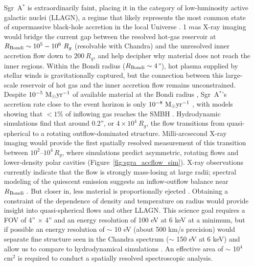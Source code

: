 \documentclass{article}
\begin{document}
\label{sec:accretion_feed}

Sgr~A$^*$ is extraordinarily faint, placing it in the category of low-luminosity active galactic nuclei (LLAGN), a regime that likely represents the most common state of supermassive black-hole accretion in the local Universe \cite{Ho2008}. 1 $m$as X-ray imaging would bridge the current gap between the resolved hot-gas reservoir at $R_{\rm Bondi} \sim 10^5-10^6\ R_g$ (resolvable with Chandra) and the unresolved inner accretion flow down to $200\ R_g$, and help decipher why material does not reach the inner regions. Within the Bondi radius ($R_{\rm Bondi} \sim 4$''), hot plasma supplied by stellar winds is gravitationally captured, but the connection between this large-scale reservoir of hot gas and the inner accretion flow remains unconstrained. Despite $10^{-5}\ \rm M_\odot yr^{-1}$ of available material at the Bondi radius \cite{Cuadra2008}, Sgr~A$^*$'s accretion rate close to the event horizon is only $10^{-8}\ \rm M_\odot yr^{-1}$ \cite{Ressler2020}, with models showing that $< 1\%$ of inflowing gas reaches the SMBH \cite{Yuan2014}. Hydrodynamic simulations find that around 0.2'', or $4\times 10^4\ R_g$, the flow transitions from quasi-spherical to a rotating outflow-dominated structure. Milli-arcsecond X-ray imaging would provide the first spatially resolved measurement of this transition between $10^{2}$--$10^{4}\,R_g$, where simulations predict asymmetric, rotating flows and lower-density polar cavities (Figure~\ref{fig:sgra_accflow_sim}). X-ray observations currently indicate that the flow is strongly mass-losing at large radii; spectral modeling of the quiescent emission suggests an inflow-outflow balance near $R_{\rm Bondi}$ \cite{Balakrishnan2024, Wang2013}. But closer in, less material is proportionally ejected \cite{Ma2019}. Obtaining a constraint of the dependence of density and temperature on radius would provide insight into quasi-spherical flows and other LLAGN. This science goal requires a FOV of 4'' $\times$ 4'' and an energy resolution of 100 eV at 6 keV at a minimum, but if possible an energy resolution of $\sim$ 10 eV (about 500 km/s precision) would separate fine structure seen in the Chandra spectrum ($\sim$ 150 eV at 6 keV) and allow us to compare to hydrodynamical simulations \cite{Ressler2018}. An effective area of $\sim$ 10$^4$ cm$^2$ is required to conduct a spatially resolved spectroscopic analysis.
\end{document}

